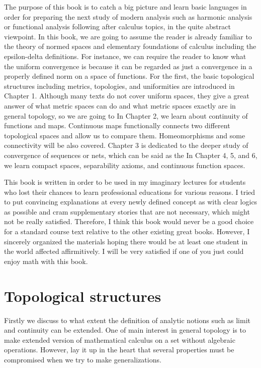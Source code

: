 \documentclass{../crs}
\begin{document}
The purpose of this book is to catch a big picture and learn basic languages in order for preparing the next study of modern analysis such as harmonic analysis or functional analysis following after calculus topics, in the quite abstract viewpoint.
In this book, we are going to assume the reader is already familiar to the theory of normed spaces and elementary foundations of calculus including the epsilon-delta definitions.
For instance, we can require the reader to know what the uniform convergence is because it can be regarded as just a convergence in a properly defined norm on a space of functions.
For the first, the basic topological structures including metrics, topologies, and uniformities are introduced in Chapter 1.
Although many texts do not cover uniform spaces, they give a great answer of what metric spaces can do and what metric spaces exactly are in general topology, so we are going to 
In Chapter 2, we learn about continuity of functions and maps.
Continuous maps functionally connects two different topological spaces and allow us to compare them.
Homeomorphisms and some connectivity will be also covered.
Chapter 3 is dedicated to the deeper study of convergence of sequences or nets, which can be said as the 
In Chapter 4, 5, and 6, we learn compact spaces, separability axioms, and continuous function spaces.

This book is written in order to be used in my imaginary lectures for students who lost their chances to learn professional educations for various reasons.
I tried to put convincing explanations at every newly defined concept as with clear logics as possible and cram supplementary stories that are not necessary, which might not be really satisfied.
Therefore, I think this book would never be a good choice for a standard course text relative to the other existing great books.
However, I sincerely organized the materials hoping there would be at least one student in the world affected affirmitively.
I will be very satisfied if one of you just could enjoy math with this book.

\mainmatter


\chapter{Topological structures}

Firstly we discuss to what extent the definition of analytic notions such as limit and continuity can be extended.
One of main interest in general topology is to make extended version of mathematical calculus on a set without algebraic operations.
However, lay it up in the heart that several properties must be compromised when we try to make generalizations.
\end{document}
